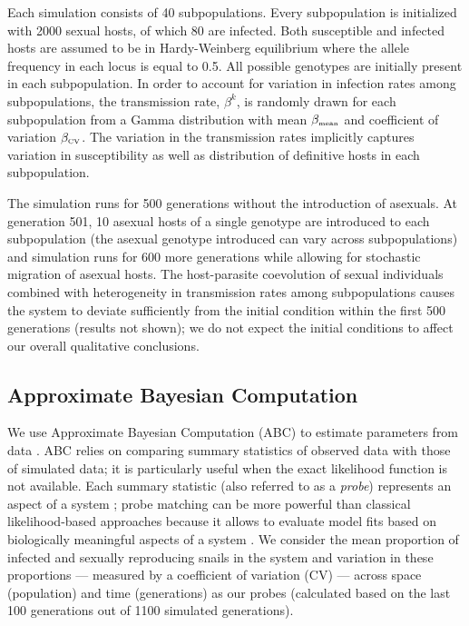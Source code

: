 \documentclass{article}\usepackage[]{graphicx}\usepackage[]{color}
\begin{document}
Each simulation consists of 40 subpopulations. 
Every subpopulation is initialized with 2000 sexual hosts, of which 80 are infected. 
Both susceptible and infected hosts are assumed to be in Hardy-Weinberg equilibrium where the allele frequency in each locus is equal to 0.5.
All possible genotypes are initially present in each subpopulation.
In order to account for variation in infection rates among subpopulations, the transmission rate, $\beta^k$, is randomly drawn for each subpopulation from a Gamma distribution with mean $\beta_{\textrm{\tiny mean}}$ and coefficient of variation $\beta_{\textrm{\tiny CV}}$. 
The variation in the transmission rates implicitly captures 
variation in susceptibility \citep{krist2000spatial, gibson2016fine} as well as distribution of definitive hosts \citep{lively1996clinal, jokela2009maintenance, king2009geographic} in each subpopulation.

The simulation runs for 500 generations without the introduction of asexuals.
At generation 501, 10 asexual hosts of a single genotype are introduced to each subpopulation (the asexual genotype introduced can vary across subpopulations) and simulation runs for 600 more generations while allowing for stochastic migration of asexual hosts.
The host-parasite coevolution of sexual individuals combined with heterogeneity in transmission rates among subpopulations causes the system to deviate sufficiently from the initial condition within the first 500 generations (results not shown); we do not expect the initial conditions to affect our 
overall qualitative conclusions.

\subsection{Approximate Bayesian Computation}

We use Approximate Bayesian Computation (ABC) to estimate parameters from data \citep{toni2009approximate}.
ABC relies on comparing summary statistics of observed data with those of simulated data; it is particularly useful when the exact likelihood function is not available.
Each summary statistic (also referred to as a \emph{probe}) represents an aspect of a system \cite{kendall1999populations};
probe matching can be more powerful than classical likelihood-based approaches because it allows to evaluate model fits based on biologically meaningful aspects of a system \citep{wood2010statistical}.
We consider the mean proportion of infected and sexually reproducing snails in the system and variation in these proportions --- measured by a coefficient of variation (CV) --- across space (population) and time (generations) as our probes (calculated based on the last 100 generations out of 1100 simulated generations).
\end{document}
